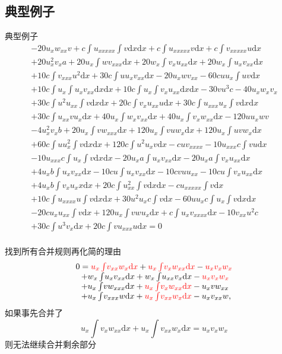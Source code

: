 \documentclass[handout]{beamer}
\newcommand{\dd}[1]{\mathrm{d}#1}
\newcommand{\ii}[1]{\int\!{#1\dd x}}
\newcommand{\red}[1]{{\color{red}#1}}
\begin{document}
\subsection{典型例子}
\begin{frame}{典型例子}
\[
\renewcommand{\arraystretch}{1.0}
\begin{array}{l}
-20u_xw_{xx}v
+c\ii{u_{xxxxx}\ii{v}}
+c\ii{u_{xxxxx}v}
+c\ii{v_{xxxxx}u}\\%
+20u_x^2v_xa
+20u_x\ii{wv_{xxx}}
+20w_x\ii{v_xu_{xx}}
+20w_x\ii{u_xv_{xx}}\\%
+10c\ii{v_{xxx}u^2}
+30c\ii{uu_xv_{xx}}
-20u_xwv_{xx}
-60cuu_x\ii{uv}\\%
+10c\ii{u_x\ii{u_xv_{xx}}}
+10c\ii{u_x\ii{v_xu_{xx}}}
-30vu^3c
-40u_xw_xv_x\\%
+30c\ii{u^2u_{xx}\ii{v}}
+20c\ii{v_xu_{xx}u}
+30c\ii{u_{xxx}u_x\ii{v}}\\%
+30c\ii{u_{xx}vu_x}
+40u_x\ii{w_xv_{xx}}
+40u_x\ii{v_xw_{xx}}
-120uu_xwv\\%
-4u_x^2v_xb
+20u_x\ii{vw_{xxx}}
+120u_x\ii{vuw_x}
+120u_x\ii{uvw_x}\\%
+60c\ii{uu_x^2\ii{v}}
+120c\ii{u^2u_xv}
-cuv_{xxxx}
-10u_{xxx}c\ii{vu}\\%
-10u_{xxx}c\ii{u_x\ii{v}}
-20u_xa\ii{u_xv_{xx}}
-20u_xa\ii{v_xu_{xx}}\\%
+4u_xb\ii{u_xv_{xx}}
-10cu\ii{u_xv_{xx}}
-10c v u u_{xx}
-10cu\ii{v_xu_{xx}}\\%
+4u_xb\ii{v_xu_xx}
+20c\ii{u_{xx}^2\ii{v}}
-cu_{xxxxx}\ii{v}\\%
+10c\ii{u_{xxxx}u\ii{v}}
+30u^2u_xc\ii{v}
-60uu_xc\ii{u_x\ii{v}}\\%
-20cu_xu_{xx}\ii{v}
+120u_x\ii{vwu_x}
+c\ii{u_xv_{xxxx}}
-10v_{xx}u^2c\\%
+30c\ii{u^3v_x}
+20c\ii{vu_{xxx}u}=0\\%
\end{array}
\]
\end{frame}

\begin{frame}{找到所有合并规则再化简的理由}
\[
\begin{array}{l}
0=\red{u_x\int\!{v_{xx}w_x\dd x}}+\red{u_x\int\!{v_xw_{xx}\dd x}}-\red{u_xv_xw_x}\\
~~+w_x\int\!{u_xv_{xx}\dd x}+w_x\int\!{u_{xx}v_x\dd x}-\red{u_xv_xw_x}\\
~~+u_x\int\!{vw_{xxx}\dd x}+\red{u_x\int\!{v_xw_{xx}\dd x}}-u_xvw_{xx}\\
~~+u_x\int\!{v_{xxx}w\dd x}+\red{u_x\int\!{v_{xx}w_x\dd x}}-u_xv_{xx}w ,
\end{array}
\]
如果事先合并了
\[
    u_x\int\!{v_xw_{xx}\dd x}+u_x\int\!{v_{xx}w_x\dd x}=u_xv_xw_x
\]
则无法继续合并剩余部分
\end{frame}
\end{document}
